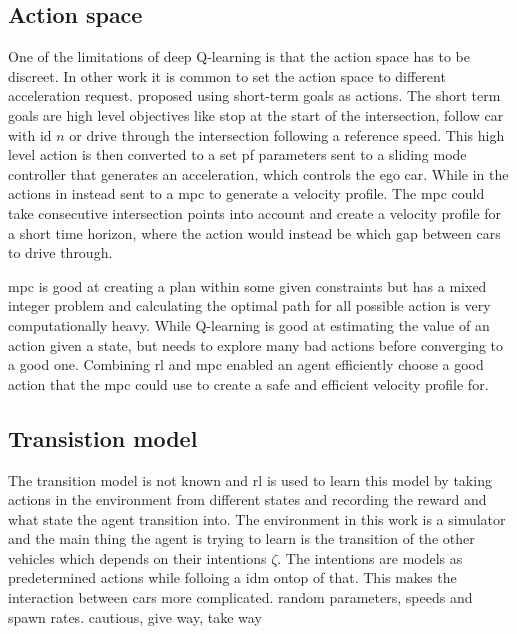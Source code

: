 \subsection{Action space}
One of the limitations of deep Q-learning is that the action space has to be discreet. In other work it is common to set the action space to different acceleration request\cite{bouton2019}. \paperLSTM proposed using short-term goals as actions. The short term goals are high level objectives like stop at the start of the intersection, follow car with id $n$ or drive through the intersection following a reference speed. This high level action is then converted to a set pf parameters sent to a sliding mode controller that generates an acceleration, which controls the ego car. 
While in \paperMPC the actions in instead sent to a \gls{mpc} to generate a velocity profile. The \gls{mpc} could take consecutive intersection points into account and create a velocity profile for a short time horizon, where the action would instead be which gap between cars to drive through.

\gls{mpc} is good at creating a plan within some given constraints but has a mixed integer problem and calculating the optimal path for all possible action is very computationally heavy. While Q-learning is good at estimating the value of an action given a state, but needs to explore many bad actions before converging to a good one. Combining \gls{rl} and \gls{mpc} enabled an agent efficiently choose a good action that the \gls{mpc} could use to create a safe and efficient velocity profile for. 

\subsection{Transistion model}
The transition model is not known and \gls{rl} is used to learn this model by taking actions in the environment from different states and recording the reward and what state the agent transition into.
The environment in this work is a simulator and the main thing the agent is trying to learn is the transition of the other vehicles which depends on their intentions $\zeta$. 
The intentions are models as predetermined actions while folloing a \gls{idm} ontop of that. This makes the interaction between cars more complicated. 
\paperLSTM random parameters, speeds and spawn rates. 
\paperMPC cautious, give way, take way


